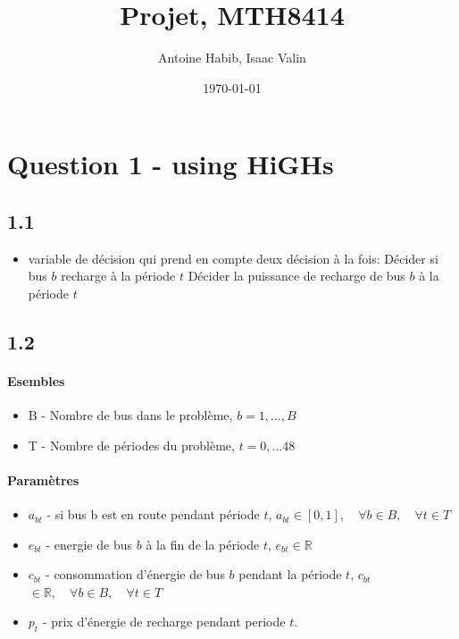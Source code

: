 \documentclass{article}
\title{Projet, MTH8414}
\author{Antoine Habib, Isaac Valin}
\date{\today}
\begin{document}
\maketitle

\section*{Question 1 - using HiGHs}

\subsection*{1.1}
\begin{itemize}
    \item variable de décision qui prend en compte deux décision à la fois:
        \subitem Décider si bus $b$ recharge à la période $t$ 
        \subitem Décider la puissance de recharge de bus $b$ à la période $t$
\end{itemize}

\subsection*{1.2}
\paragraph{Esembles}
\begin{itemize}
    \item B - Nombre de bus dans le problème, $b = 1, \dots, B$
    \item T - Nombre de périodes du problème, $t = 0,\dots 48$
\end{itemize}

\paragraph{Paramètres}
\begin{itemize}
    \item $a_{bt}$ - si bus b est en route pendant période $t$, $a_{bt}\in [0,1], \quad \forall b \in B, \quad \forall t \in T$
    \item $e_{bt}$ - energie de bus $b$ à la fin de la période $t$, $e_{bt} \in \mathbb{R}$
    \item $c_{bt}$ - consommation d'énergie de bus $b$ pendant la période $t$, $c_{bt}$ $\in \mathbb {R}, \quad \forall b \in B, \quad \forall t \in T$
    \item $p_t$ -  prix d'énergie de recharge pendant periode $t$. 
    
\end{itemize}
\end{document}

